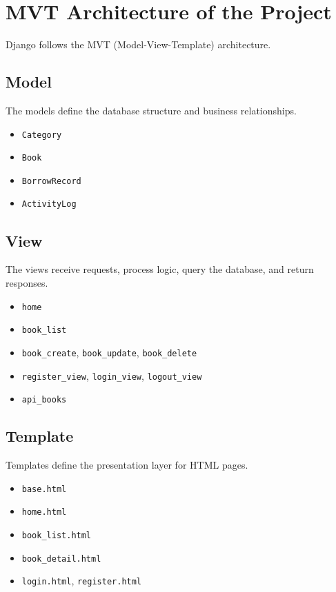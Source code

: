\documentclass[12pt,a4paper]{article}
\begin{document}
\section{MVT Architecture of the Project}
Django follows the MVT (Model-View-Template) architecture.

\subsection{Model}
The models define the database structure and business relationships.
\begin{itemize}
    \item \texttt{Category}
    \item \texttt{Book}
    \item \texttt{BorrowRecord}
    \item \texttt{ActivityLog}
\end{itemize}

\subsection{View}
The views receive requests, process logic, query the database, and return responses.
\begin{itemize}
    \item \texttt{home}
    \item \texttt{book\_list}
    \item \texttt{book\_create}, \texttt{book\_update}, \texttt{book\_delete}
    \item \texttt{register\_view}, \texttt{login\_view}, \texttt{logout\_view}
    \item \texttt{api\_books}
\end{itemize}

\subsection{Template}
Templates define the presentation layer for HTML pages.
\begin{itemize}
    \item \texttt{base.html}
    \item \texttt{home.html}
    \item \texttt{book\_list.html}
    \item \texttt{book\_detail.html}
    \item \texttt{login.html}, \texttt{register.html}
\end{itemize}
\end{document}
